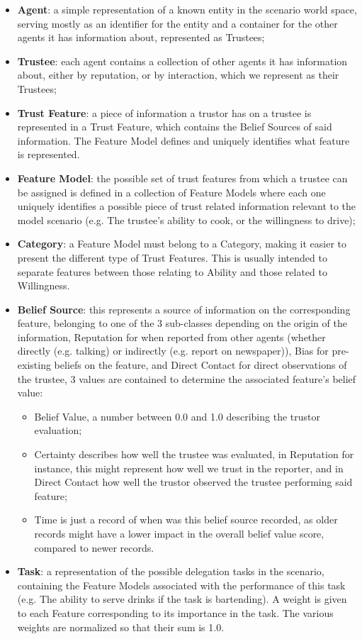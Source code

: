 \begin{itemize}
    \item \textbf{Agent}: a simple representation of a known entity in the scenario world space, serving mostly as an identifier for the entity and a container for the other agents it has information about, represented as Trustees;
    \item \textbf{Trustee}: each agent contains a collection of other agents it has information about, either by reputation, or by interaction, which we represent as their Trustees;
    \item \textbf{Trust Feature}: a piece of information a trustor has on a trustee is represented in a Trust Feature, which contains the Belief Sources of said information. The Feature Model defines and uniquely identifies what feature is represented.
    \item \textbf{Feature Model}: the possible set of trust features from which a trustee can be assigned is defined in a collection of Feature Models where each one uniquely identifies a possible piece of trust related information relevant to the model scenario (e.g. The trustee's ability to cook, or the willingness to drive);
    \item \textbf{Category}: a Feature Model must belong to a Category, making it easier to  present the different type of Trust Features. This is usually intended to separate features between those relating to Ability and those related to Willingness.
    \item \textbf{Belief Source}: this represents a source of information on the corresponding feature, belonging to one of the 3 sub-classes depending on the origin of the information, Reputation for when reported from other agents (whether directly (e.g. talking) or indirectly (e.g. report on newspaper)), Bias for pre-existing beliefs on the feature, and Direct Contact for direct observations of the trustee, 3 values are contained to determine the associated feature's belief value: 
        \begin{itemize}
            \item Belief Value, a number between 0.0 and 1.0 describing the trustor evaluation;
            \item Certainty describes how well the trustee was evaluated, in Reputation for instance, this might represent how well we trust in the reporter, and in Direct Contact how well the trustor observed the trustee performing said feature;
            \item Time is just a record of when was this belief source recorded, as older records might have a lower impact in the overall belief value score, compared to newer records.
        \end{itemize} 
    \item \textbf{Task}: a representation of the possible delegation tasks in the scenario, containing the Feature Models associated with the performance of this task (e.g. The ability to serve drinks if the task is bartending). A weight is given to each Feature corresponding to its importance in the task. The various weights are normalized so that their sum is 1.0.
\end{itemize} 


